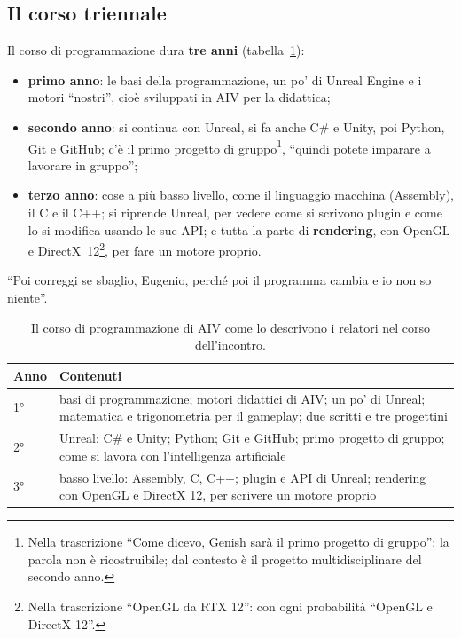 \subsection{Il corso triennale}

Il corso di programmazione dura \textbf{tre anni}
(tabella~\ref{p5:tab:anni}):
\begin{itemize}
  \item \textbf{primo anno}: le basi della programmazione, un po' di Unreal
        Engine e i motori ``nostri'', cioè sviluppati in AIV per la
        didattica;
  \item \textbf{secondo anno}: si continua con Unreal, si fa anche C\# e
        Unity, poi Python, Git e GitHub; c'è il primo progetto di
        gruppo\footnote{Nella trascrizione ``Come dicevo, Genish sarà il primo
        progetto di gruppo'': la parola non è ricostruibile; dal contesto è il
        progetto multidisciplinare del secondo anno.}, ``quindi potete
        imparare a lavorare in gruppo'';
  \item \textbf{terzo anno}: cose a più basso livello, come il linguaggio
        macchina (Assembly), il C e il C++; si riprende Unreal, per vedere come
        si scrivono plugin e come lo si modifica usando le sue API; e tutta la
        parte di \textbf{rendering}, con OpenGL e DirectX~12\footnote{Nella
        trascrizione ``OpenGL da RTX 12'': con ogni probabilità ``OpenGL e
        DirectX 12''.}, per fare un motore proprio.
\end{itemize}
``Poi correggi se sbaglio, Eugenio, perché poi il programma cambia e io non so
niente''.

\begin{table}[htbp]
\centering
\small
\begin{tabular}{@{}lp{10cm}@{}}
\toprule
\textbf{Anno} & \textbf{Contenuti} \\
\midrule
1° & basi di programmazione; motori didattici di AIV; un po' di Unreal;
matematica e trigonometria per il gameplay; due scritti e tre progettini \\
2° & Unreal; C\# e Unity; Python; Git e GitHub; primo progetto di gruppo;
come si lavora con l'intelligenza artificiale \\
3° & basso livello: Assembly, C, C++; plugin e API di Unreal; rendering con
OpenGL e DirectX 12, per scrivere un motore proprio \\
\bottomrule
\end{tabular}
\caption{Il corso di programmazione di AIV come lo descrivono i relatori
nel corso dell'incontro.}
\label{p5:tab:anni}
\end{table}

